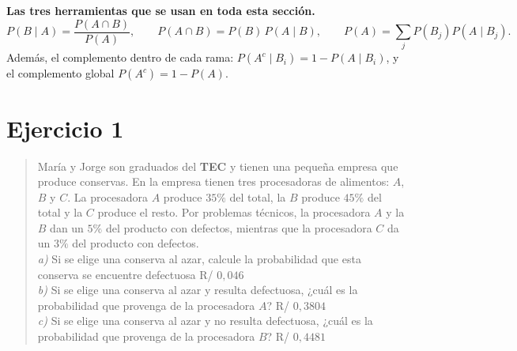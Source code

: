 \documentclass[11pt]{article}
\begin{document}
\begin{reg}
\textbf{Las tres herramientas que se usan en toda esta sección.}
\[
P(B\mid A)=\frac{P(A\cap B)}{P(A)},\qquad
P(A\cap B)=P(B)\,P(A\mid B),\qquad
P(A)=\sum_{j}P(B_j)P(A\mid B_j).
\]
Además, el complemento dentro de cada rama: $P(A^{c}\mid B_i)=1-P(A\mid B_i)$, y el complemento global $P(A^{c})=1-P(A)$.
\end{reg}

\newpage
\section*{Ejercicio 1}

\begin{quote}
María y Jorge son graduados del \textbf{TEC} y tienen una pequeña empresa que produce conservas. En la empresa tienen tres procesadoras de alimentos: $A$, $B$ y $C$. La procesadora $A$ produce $35\%$ del total, la $B$ produce $45\%$ del total y la $C$ produce el resto. Por problemas técnicos, la procesadora $A$ y la $B$ dan un $5\%$ del producto con defectos, mientras que la procesadora $C$ da un $3\%$ del producto con defectos.\\
\emph{a)} Si se elige una conserva al azar, calcule la probabilidad que esta conserva se encuentre defectuosa \hfill R/ $0,046$\\
\emph{b)} Si se elige una conserva al azar y resulta defectuosa, ¿cuál es la probabilidad que provenga de la procesadora $A$? \hfill R/ $0,3804$\\
\emph{c)} Si se elige una conserva al azar y no resulta defectuosa, ¿cuál es la probabilidad que provenga de la procesadora $B$? \hfill R/ $0,4481$
\end{quote}
\end{document}
